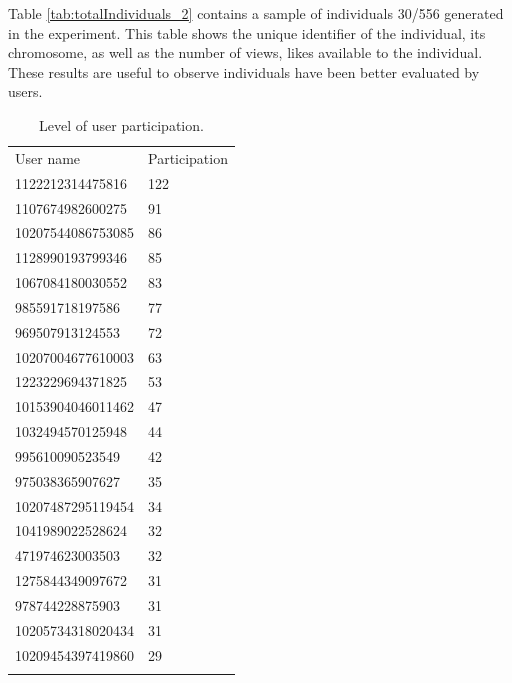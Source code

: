 Table \ref{tab:totalIndividuals_2} contains a sample of individuals 30/556
generated in the experiment. This table shows the unique identifier of the
individual, its chromosome, as well as the number of views, likes available to
the individual. These results are useful to observe individuals have been better
evaluated by users.

\begin{table}
\small
\caption{Level of user participation.}
\label{tab:userParticipation_2}
\centering
\small
\begin{tabular}{p{4cm} p{4cm}}
\hline\noalign{\smallskip}
 User name & Participation   \\
\noalign{\smallskip}\hline\noalign{\smallskip}
\small{1122212314475816} & \small{122} \\ \hline
\small{1107674982600275} & \small{91} \\ \hline
\small{10207544086753085} & \small{86} \\ \hline
\small{1128990193799346} & \small{85} \\ \hline
\small{1067084180030552} & \small{83} \\ \hline
\small{985591718197586} & \small{77} \\ \hline
\small{969507913124553} & \small{72} \\ \hline
\small{10207004677610003} & \small{63} \\ \hline
\small{1223229694371825} & \small{53} \\ \hline
\small{10153904046011462} & \small{47} \\ \hline
\small{1032494570125948} & \small{44} \\ \hline
\small{995610090523549} & \small{42} \\ \hline
\small{975038365907627} & \small{35} \\ \hline
\small{10207487295119454} & \small{34} \\ \hline
\small{1041989022528624} & \small{32} \\ \hline
\small{471974623003503} & \small{32} \\ \hline
\small{1275844349097672} & \small{31} \\ \hline
\small{978744228875903} & \small{31} \\ \hline
\small{10205734318020434} & \small{31} \\ \hline
\small{10209454397419860} & \small{29} \\ \hline


\noalign{\smallskip}\hline
\end{tabular}
\end{table}

